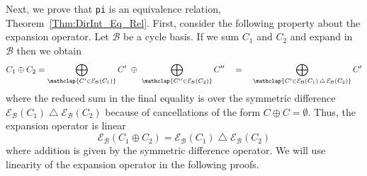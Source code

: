 \documentclass[fleqn,11pt]{article}
\newcommand\calB{\mathcal{B}}
\newcommand\expand[2]{\mathcal{E}_{#1}\left(#2\right)}   %
\newcommand\symdiff{\mathop{\triangle}}
\begin{document}
Next, we prove that {\tt pi} is an equivalence relation, Theorem~\ref{Thm:DirInt_Eq_Rel}. 
First, consider the following property about the expansion operator. Let $\calB$ be a cycle basis. If we sum $C_1$ and $C_2$ and expand in $\calB$ then we obtain
\begin{equation}
	C_1\oplus C_2 = \bigoplus_{\mathclap{C'\in\expand{\calB}{C_1}}}C' 
	\;\oplus\; 
	\bigoplus_{\mathclap{C''\in\expand{\calB}{C_2}}} C'' 
	\quad=\quad
	\bigoplus_{\mathclap{C'\in\expand{\calB}{C_1}\symdiff\expand{\calB}{C_2}}} C'
\end{equation}
where the reduced sum in the final equality is over the symmetric difference $\expand{\calB}{C_1}\symdiff\expand{\calB}{C_2}$ because of cancellations of the form $C\oplus C=\emptyset$. Thus, the expansion operator is linear
\begin{equation}
	\expand{\calB}{C_1\oplus C_2} = \expand{\calB}{C_1}\symdiff\expand{\calB}{C_2}
	\label{eq:expand_linear}
\end{equation}
where addition is given by the symmetric difference operator. We will use linearity of the expansion operator in the following proofs.


\end{document}
